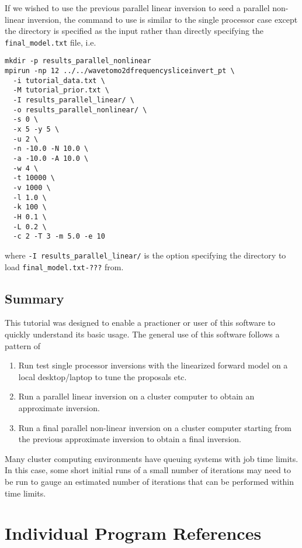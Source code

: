 \documentclass[a4paper,12pt]{article}
\begin{document}
If we wished to use the previous parallel linear inversion to seed a
parallel non-linear inversion, the command to use is similar to the
single processor case except the directory is specified as the
input rather than directly specifying the {\tt final\_model.txt}
file, i.e.

\begin{verbatim}
mkdir -p results_parallel_nonlinear
mpirun -np 12 ../../wavetomo2dfrequencysliceinvert_pt \
  -i tutorial_data.txt \
  -M tutorial_prior.txt \
  -I results_parallel_linear/ \
  -o results_parallel_nonlinear/ \
  -s 0 \
  -x 5 -y 5 \
  -u 2 \
  -n -10.0 -N 10.0 \
  -a -10.0 -A 10.0 \
  -w 4 \
  -t 10000 \
  -v 1000 \
  -l 1.0 \
  -k 100 \
  -H 0.1 \
  -L 0.2 \
  -c 2 -T 3 -m 5.0 -e 10
\end{verbatim}

where {\tt -I results\_parallel\_linear/} is the option specifying the
directory to load {\tt final\_model.txt-???} from.

\subsection{Summary}

This tutorial was designed to enable a practioner or user of this
software to quickly understand its basic usage. The general use of
this software follows a pattern of

\begin{enumerate}
\item Run test single processor inversions with the linearized forward
  model on a local desktop/laptop to tune the proposals etc.
\item Run a parallel linear inversion on a cluster computer to obtain
  an approximate inversion.
\item Run a final parallel non-linear inversion on a cluster computer
  starting from the previous approximate inversion to obtain a final inversion.
\end{enumerate}

Many cluster computing environments have queuing systems with job
time limits. In this case, some short initial runs of a small number of
iterations may need to be run to gauge an estimated number of iterations
that can be performed within time limits.

\section{Individual Program References}
\end{document}
